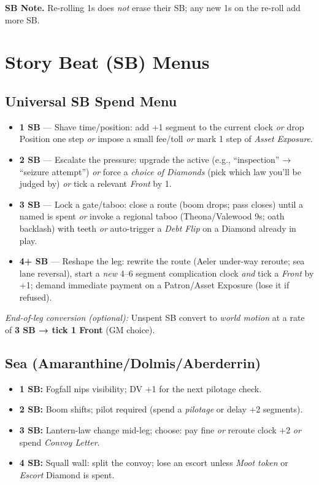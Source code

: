 \documentclass[11pt,letterpaper,twoside]{book}
\begin{document}
\noindent\textbf{SB Note.} Re-rolling 1s does \emph{not} erase their SB; any new 1s on the re-roll add more SB.

\section{Story Beat (SB) Menus}

\subsection{Universal SB Spend Menu}
\begin{itemize}
  \item \textbf{1 SB} — Shave time/position: add +1 segment to the current clock \emph{or} drop Position one step \emph{or} impose a small fee/toll \emph{or} mark 1 step of \emph{Asset Exposure}.
  \item \textbf{2 SB} — Escalate the pressure: upgrade the active \SuitClub{} (e.g., ``inspection'' → ``seizure attempt'') \emph{or} force a \emph{choice of Diamonds} (pick which law you'll be judged by) \emph{or} tick a relevant \emph{Front} by 1.
  \item \textbf{3 SB} — Lock a gate/taboo: close a route (boom drops; pass closes) until a named \SuitDiamond{} is spent \emph{or} invoke a regional taboo (Theona/Valewood 9s; oath backlash) with teeth \emph{or} auto-trigger a \emph{Debt Flip} on a Diamond already in play.
  \item \textbf{4+ SB} — Reshape the leg: rewrite the route (Aeler under-way reroute; sea lane reversal), start a \emph{new} 4--6 segment complication clock \emph{and} tick a \emph{Front} by +1; demand immediate payment on a Patron/Asset Exposure (lose it if refused).
\end{itemize}
\textit{End-of-leg conversion (optional):} Unspent SB convert to \emph{world motion} at a rate of \textbf{3 SB → tick 1 Front} (GM choice).

\subsection{Sea (Amaranthine/Dolmis/Aberderrin)}
\begin{itemize}
  \item \textbf{1 SB:} Fogfall nips visibility; DV +1 for the next pilotage check.
  \item \textbf{2 SB:} Boom shifts; pilot required (spend a \emph{pilotage} \SuitDiamond{} or delay +2 segments).
  \item \textbf{3 SB:} Lantern-law change mid-leg; choose: pay fine \emph{or} reroute clock +2 \emph{or} spend \emph{Convoy Letter}.
  \item \textbf{4 SB:} Squall wall: split the convoy; lose an escort unless \emph{Moot token} or \emph{Escort} Diamond is spent.
\end{itemize}
\end{document}
